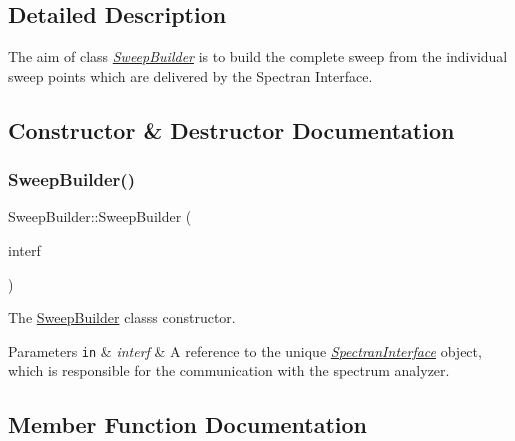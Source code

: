 \subsection{Detailed Description}
The aim of class {\itshape \hyperlink{classSweepBuilder}{Sweep\+Builder}} is to build the complete sweep from the individual sweep points which are delivered by the Spectran Interface. 

\subsection{Constructor \& Destructor Documentation}
\mbox{\label{classSweepBuilder_a41b1ecbd8c74953fe0ad5bfbf03be667}} 
\subsubsection{\texorpdfstring{Sweep\+Builder()}{SweepBuilder()}}
{\footnotesize\ttfamily Sweep\+Builder\+::\+Sweep\+Builder (\begin{DoxyParamCaption}\item[{\hyperlink{classSpectranInterface}{Spectran\+Interface} \&}]{interf }\end{DoxyParamCaption})\hspace{0.3cm}{\ttfamily [inline]}}



The \hyperlink{classSweepBuilder}{Sweep\+Builder} class\textquotesingle{}s constructor. 


\begin{DoxyParams}[1]{Parameters}
\mbox{\tt in}  & {\em interf} & A reference to the unique {\itshape \hyperlink{classSpectranInterface}{Spectran\+Interface}} object, which is responsible for the communication with the spectrum analyzer. \\
\hline
\end{DoxyParams}


\subsection{Member Function Documentation}
\mbox{\label{classSweepBuilder_ae8893395594bbf68873d33e3e7a0d192}} 
